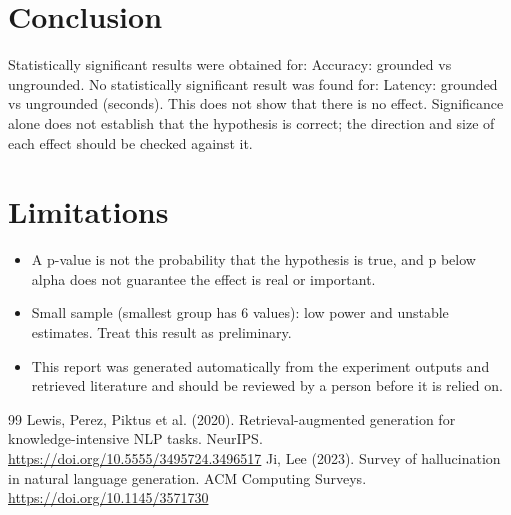 \documentclass[11pt]{article}
\begin{document}
\section{Conclusion}
Statistically significant results were obtained for: Accuracy: grounded vs ungrounded. No statistically significant result was found for: Latency: grounded vs ungrounded (seconds). This does not show that there is no effect. Significance alone does not establish that the hypothesis is correct; the direction and size of each effect should be checked against it.

\section{Limitations}
\begin{itemize}
\item A p-value is not the probability that the hypothesis is true, and p below alpha does not guarantee the effect is real or important.
\item Small sample (smallest group has 6 values): low power and unstable estimates. Treat this result as preliminary.
\item This report was generated automatically from the experiment outputs and retrieved literature and should be reviewed by a person before it is relied on.
\end{itemize}
\begin{thebibliography}{99}
 Lewis, Perez, Piktus et al. (2020). Retrieval-augmented generation for knowledge-intensive NLP tasks. NeurIPS. \url{https://doi.org/10.5555/3495724.3496517}
 Ji, Lee (2023). Survey of hallucination in natural language generation. ACM Computing Surveys. \url{https://doi.org/10.1145/3571730}
\end{thebibliography}
\end{document}
